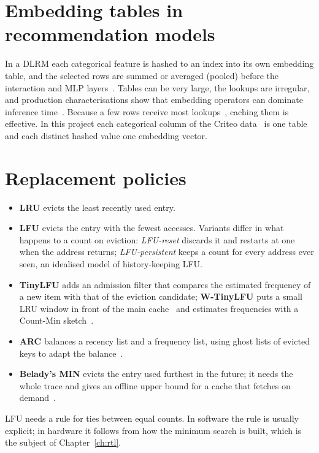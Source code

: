\documentclass[11pt,a4paper]{report}
\begin{document}
\section{Embedding tables in recommendation models}
In a DLRM each categorical feature is hashed to an index into its own embedding table, and the selected rows are
summed or averaged (pooled) before the interaction and MLP layers~\cite{naumov2019dlrm}. Tables can be very large,
the lookups are irregular, and production characterisations show that embedding operators can dominate inference
time~\cite{gupta2020architectural}. Because a few rows receive most lookups~\cite{adnan2022fae,agarwal2023bagpipe},
caching them is effective. In this project each categorical column of the Criteo data~\cite{criteo2014dac} is one
table and each distinct hashed value one embedding vector.

\section{Replacement policies}
\begin{itemize}
\item \textbf{LRU} evicts the least recently used entry.
\item \textbf{LFU} evicts the entry with the fewest accesses. Variants differ in what happens to a count on
eviction: \emph{LFU-reset} discards it and restarts at one when the address returns; \emph{LFU-persistent} keeps a
count for every address ever seen, an idealised model of history-keeping LFU.
\item \textbf{TinyLFU} adds an admission filter that compares the estimated frequency of a new item with that of the
eviction candidate; \textbf{W-TinyLFU} puts a small LRU window in front of the main cache~\cite{einziger2017tinylfu}
and estimates frequencies with a Count-Min sketch~\cite{cormode2005countmin}.
\item \textbf{ARC} balances a recency list and a frequency list, using ghost lists of evicted keys to adapt the
balance~\cite{megiddo2003arc}.
\item \textbf{Belady's MIN} evicts the entry used furthest in the future; it needs the whole trace and gives an
offline upper bound for a cache that fetches on demand~\cite{belady1966study}.
\end{itemize}
LFU needs a rule for ties between equal counts. In software the rule is usually explicit; in hardware it follows from
how the minimum search is built, which is the subject of Chapter~\ref{ch:rtl}.
\end{document}
